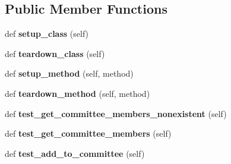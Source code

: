 \subsection*{Public Member Functions}
\begin{DoxyCompactItemize}
\item 
\mbox{\label{classapp_1_1members_1_1test__members_1_1_test_members_a8b120662e7a180e4d1fc18c39fafb21b}} 
def {\bfseries setup\+\_\+class} (self)
\item 
\mbox{\label{classapp_1_1members_1_1test__members_1_1_test_members_aa37c8f54deeda95fbbc0d31488ff8424}} 
def {\bfseries teardown\+\_\+class} (self)
\item 
\mbox{\label{classapp_1_1members_1_1test__members_1_1_test_members_aa9c0c4dfd6a7a9a19f12bf28ac4c7d1f}} 
def {\bfseries setup\+\_\+method} (self, method)
\item 
\mbox{\label{classapp_1_1members_1_1test__members_1_1_test_members_ac9556db2e59ff523464df23540b79459}} 
def {\bfseries teardown\+\_\+method} (self, method)
\item 
\mbox{\label{classapp_1_1members_1_1test__members_1_1_test_members_ac64a28e7c1e3aae593d9a13f011e7036}} 
def {\bfseries test\+\_\+get\+\_\+committee\+\_\+members\+\_\+nonexistent} (self)
\item 
\mbox{\label{classapp_1_1members_1_1test__members_1_1_test_members_aeadd7c23ac4fc67dc09d8dde9a3d8690}} 
def {\bfseries test\+\_\+get\+\_\+committee\+\_\+members} (self)
\item 
\mbox{\label{classapp_1_1members_1_1test__members_1_1_test_members_a72e09ac57d4c00d4d8c69b51122ee9e5}} 
def {\bfseries test\+\_\+add\+\_\+to\+\_\+committee} (self)
\item 
\mbox{\label{classapp_1_1members_1_1test__members_1_1_test_members_aea29ea0e269502dec5589e738fd28f8e}} 

\end{DoxyCompactItemize}
